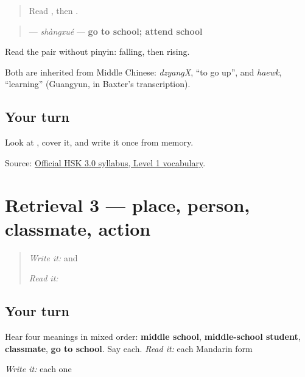 \begin{quote}
Read , then .
\end{quote}

\begin{cousinweb}
\begin{quote}
\textbf{} — \emph{shàngxué} — \textbf{go to school; attend school}
\end{quote}

Read the pair without pinyin: falling, then rising.

Both are inherited from Middle Chinese: \emph{dzyangX}, \textquotedblleft{}to go up\textquotedblright{}, and \emph{haewk}, \textquotedblleft{}learning\textquotedblright{} (Guangyun, in Baxter's transcription).
\end{cousinweb}

\subsection*{Your turn}
Look at \textbf{}, cover it, and write it once from memory.

\begin{tcolorbox}[breakable,colback=teal!4,colframe=teal!35!black,title={Before you move on}]
Source: \href{https://hsk.cn-bj.ufileos.com/3.0/\%E6\%96\%B0\%E7\%89\%88HSK\%E8\%80\%83\%E8\%AF\%95\%E5\%A4\%A7\%E7\%BA\%B21219.pdf}{Official HSK 3.0 syllabus, Level 1 vocabulary}.
\end{tcolorbox}
\section[Practice]{Retrieval 3 — place, person, classmate, action}

\label{lesson:ZH-R15-school-map-3}



\begin{quote}
\emph{Write it:}  and 

\emph{Read it:} 
\end{quote}

\subsection*{Your turn}
Hear four meanings in mixed order: \textbf{middle school}, \textbf{middle-school student}, \textbf{classmate}, \textbf{go to school}. Say each. \emph{Read it:} each Mandarin form

\emph{Write it:} each one

